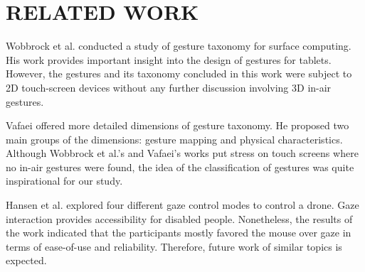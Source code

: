 \documentclass{sigchi}
\begin{document}


\section{RELATED WORK}
Wobbrock et al. \cite{Wobbrock:2009:UGS:1518701.1518866} conducted a study of gesture taxonomy for surface computing. His work provides important insight into the design of gestures for tablets. However, the gestures and its taxonomy concluded in this work were subject to 2D touch-screen devices without any further discussion involving 3D in-air gestures.

Vafaei \cite{Vafaei:2013} offered more detailed dimensions of gesture taxonomy. He proposed two main groups of the dimensions: gesture mapping and physical characteristics. Although Wobbrock et al.'s and Vafaei's works put stress on touch screens where no in-air gestures were found, the idea of the classification of gestures was quite inspirational for our study.

Hansen et al. \cite{Hansen:2014:UGC:2578153.2578156} explored four different gaze control modes to control a drone. Gaze interaction provides accessibility for disabled people. Nonetheless, the results of the work indicated that the participants mostly favored the mouse over gaze in terms of ease-of-use and reliability. Therefore, future work of similar topics is expected.
\end{document}
